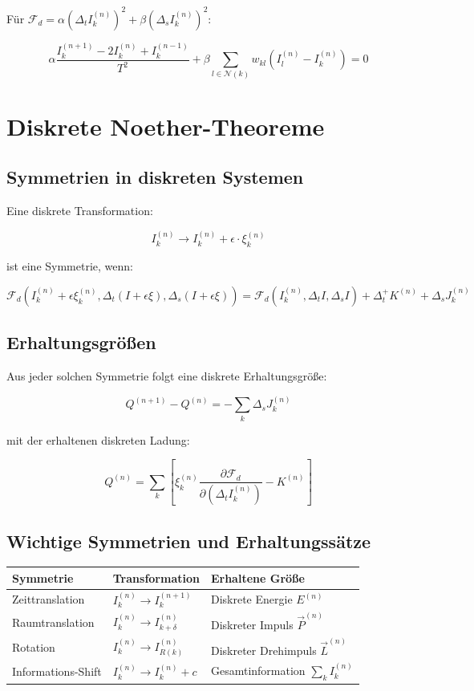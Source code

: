 Für \( \mathcal{F}_d = \alpha (\Delta_t I_k^{(n)})^2 + \beta (\Delta_s I_k^{(n)})^2 \):

\[
\alpha \frac{I_k^{(n+1)} - 2I_k^{(n)} + I_k^{(n-1)}}{T^2} + \beta \sum_{l \in \mathcal{N}(k)} w_{kl} (I_l^{(n)} - I_k^{(n)}) = 0
\]

\section{Diskrete Noether-Theoreme}
\label{app:mathematik_noether}

\subsection{Symmetrien in diskreten Systemen}
\label{sub:mathematik_symmetrien}

Eine diskrete Transformation:

\[
I_k^{(n)} \to I_k^{(n)} + \epsilon \cdot \xi_k^{(n)}
\]

ist eine Symmetrie, wenn:

\[
\mathcal{F}_d \left( I_k^{(n)} + \epsilon \xi_k^{(n)}, \Delta_t (I + \epsilon \xi), \Delta_s (I + \epsilon \xi) \right) = \mathcal{F}_d \left( I_k^{(n)}, \Delta_t I, \Delta_s I \right) + \Delta_t^+ K^{(n)} + \Delta_s J_k^{(n)}
\]

\subsection{Erhaltungsgrößen}
\label{sub:mathematik_erhaltung}

Aus jeder solchen Symmetrie folgt eine diskrete Erhaltungsgröße:

\[
Q^{(n+1)} - Q^{(n)} = -\sum_k \Delta_s J_k^{(n)}
\]

mit der erhaltenen diskreten Ladung:

\[
Q^{(n)} = \sum_k \left[ \xi_k^{(n)} \frac{\partial \mathcal{F}_d}{\partial (\Delta_t I_k^{(n)})} - K^{(n)} \right]
\]

\subsection{Wichtige Symmetrien und Erhaltungssätze}
\label{sub:mathematik_symmetrien_tabelle}

\begin{tabular}{|l|l|l|}
\hline
\textbf{Symmetrie} & \textbf{Transformation} & \textbf{Erhaltene Größe} \\
\hline
Zeittranslation & \(I_k^{(n)} \to I_k^{(n+1)}\) & Diskrete Energie \(E^{(n)}\) \\
Raumtranslation & \(I_k^{(n)} \to I_{k+\delta}^{(n)}\) & Diskreter Impuls \(\vec{P}^{(n)}\) \\
Rotation & \(I_k^{(n)} \to I_{R(k)}^{(n)}\) & Diskreter Drehimpuls \(\vec{L}^{(n)}\) \\
Informations-Shift & \(I_k^{(n)} \to I_k^{(n)} + c\) & Gesamtinformation \(\sum_k I_k^{(n)}\) \\
\hline
\end{tabular}

